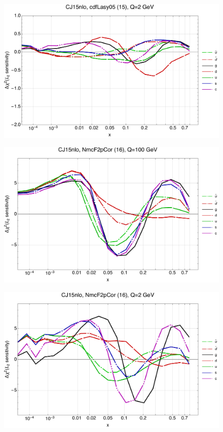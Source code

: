 \documentclass[10pt,aps,prd,floatfix,titlepage]{revtex4}
\begin{document}
\begin{figure}
\includegraphics[width=\textwidth,height=0.44\textheight,keepaspectratio]{1/15_CJ15nlo_L2_q2_Sf_1.pdf}
\caption{}
\end{figure}
\clearpage
\begin{figure}
\includegraphics[width=\textwidth,height=0.44\textheight,keepaspectratio]{1/16_CJ15nlo_L2_q100_Sf_1.pdf}
\caption{}
\end{figure}
\begin{figure}
\includegraphics[width=\textwidth,height=0.44\textheight,keepaspectratio]{1/16_CJ15nlo_L2_q2_Sf_1.pdf}
\caption{}
\end{figure}
\end{document}
